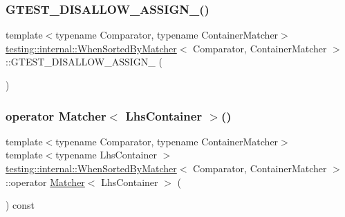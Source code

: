 \subsubsection{\texorpdfstring{G\+T\+E\+S\+T\+\_\+\+D\+I\+S\+A\+L\+L\+O\+W\+\_\+\+A\+S\+S\+I\+G\+N\+\_\+()}{GTEST\_DISALLOW\_ASSIGN\_()}}
{\footnotesize\ttfamily template$<$typename Comparator, typename Container\+Matcher$>$ \\
\hyperlink{classtesting_1_1internal_1_1WhenSortedByMatcher}{testing\+::internal\+::\+When\+Sorted\+By\+Matcher}$<$ Comparator, Container\+Matcher $>$\+::G\+T\+E\+S\+T\+\_\+\+D\+I\+S\+A\+L\+L\+O\+W\+\_\+\+A\+S\+S\+I\+G\+N\+\_\+ (\begin{DoxyParamCaption}\item[{\hyperlink{classtesting_1_1internal_1_1WhenSortedByMatcher}{When\+Sorted\+By\+Matcher}$<$ Comparator, Container\+Matcher $>$}]{ }\end{DoxyParamCaption})\hspace{0.3cm}{\ttfamily [private]}}

\mbox{\label{classtesting_1_1internal_1_1WhenSortedByMatcher_ae76285fee36055ffde63492102d3c67f}} 
\subsubsection{\texorpdfstring{operator Matcher$<$ Lhs\+Container $>$()}{operator Matcher< LhsContainer >()}}
{\footnotesize\ttfamily template$<$typename Comparator, typename Container\+Matcher$>$ \\
template$<$typename Lhs\+Container $>$ \\
\hyperlink{classtesting_1_1internal_1_1WhenSortedByMatcher}{testing\+::internal\+::\+When\+Sorted\+By\+Matcher}$<$ Comparator, Container\+Matcher $>$\+::operator \hyperlink{classtesting_1_1Matcher}{Matcher}$<$ Lhs\+Container $>$ (\begin{DoxyParamCaption}{ }\end{DoxyParamCaption}) const\hspace{0.3cm}{\ttfamily [inline]}}



